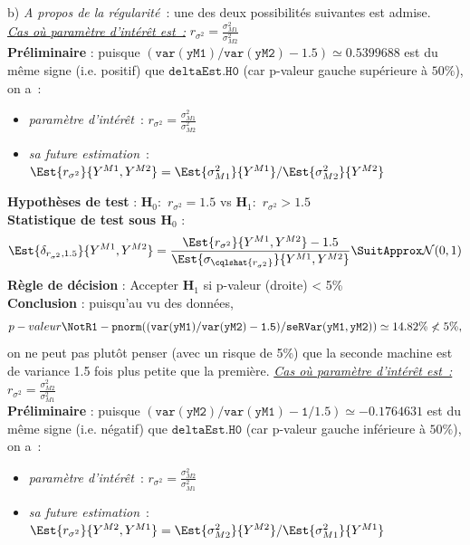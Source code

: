 \documentclass[10pt]{report}
\begin{document}
\begin{exercice}
\begin{Correction}
  
\noindent b) \noindent \textit{A propos de la régularité}~: une des deux possibilités suivantes est admise.\\
\noindent \textit{\underline{Cas où paramètre d'intérêt est~:}} $r_{\sigma^2}=\displaystyle \frac{\sigma^2_{M1}}{\sigma^2_{M2}}$\\
\noindent \textbf{Préliminaire} : puisque $\mathtt{(var(yM1)/var(yM2)-1.5)}\simeq0.5399688$ est du même signe (i.e. positif) que $\mathtt{deltaEst.H0}$ (car p-valeur gauche supérieure à $50\%$), on a~: 
      \begin{itemize}
\item \textit{paramètre d'intérêt}~: $r_{\sigma^2}=\displaystyle \frac{\sigma^2_{M1}}{\sigma^2_{M2}}$
\item \textit{sa future estimation}~: $\Est{r_{\sigma^2}}{Y^{M1},Y^{M2}}=\Est{\sigma^2_{M1}}{Y^{M1}}/\Est{\sigma^2_{M2}}{Y^{M2}}$
\end{itemize}
\noindent \textbf{Hypothèses de test} : $\mathbf{H}_0:$ $r_{\sigma^2}=1.5$ vs {\large $\mathbf{H}_1:$ $r_{\sigma^2}>1.5$}\\
\textbf{Statistique de test sous $\mathbf{H}_0$} :
  $$
  \Est{\delta_{r_{\sigma^2},1.5}}{Y^{M1},Y^{M2}}= {\displaystyle \frac{\Est{r_{\sigma^2}}{Y^{M1},Y^{M2}}-1.5}{
\Est{\sigma_{\cqlshat{r_{\sigma^2}}}}{Y^{M1},Y^{M2}}
}} 
  \SuitApprox \mathcal{N}(0,1)
  $$
\textbf{Règle de décision} : Accepter $\mathbf{H}_1$ si 
  p-valeur (droite) < 5\%\\
\noindent \textbf{Conclusion} :
puisqu'au vu des données, 
  \[
p-valeur\NotR\mathtt{1-pnorm((var(yM1)/var(yM2)-1.5)/seRVar(yM1,yM2))} \simeq 14.82\%\nless5\%,
\]
on ne peut pas plutôt penser (avec un risque de 5\%) que la seconde machine est de variance 1.5 fois plus petite que la premi{\`e}re.
\noindent \textit{\underline{Cas où paramètre d'intérêt est~:}} $r_{\sigma^2}=\displaystyle \frac{\sigma^2_{M2}}{\sigma^2_{M1}}$\\
\noindent \textbf{Préliminaire} : puisque $\mathtt{(var(yM2)/var(yM1)-1/1.5)}\simeq-0.1764631$ est du même signe (i.e. négatif) que $\mathtt{deltaEst.H0}$ (car p-valeur gauche inférieure à $50\%$), on a~: 
      \begin{itemize}
\item \textit{paramètre d'intérêt}~: $r_{\sigma^2}=\displaystyle \frac{\sigma^2_{M2}}{\sigma^2_{M1}}$
\item \textit{sa future estimation}~: $\Est{r_{\sigma^2}}{Y^{M2},Y^{M1}}=\Est{\sigma^2_{M2}}{Y^{M2}}/\Est{\sigma^2_{M1}}{Y^{M1}}$
\end{itemize}

\end{Correction}
\end{exercice}
\end{document}
